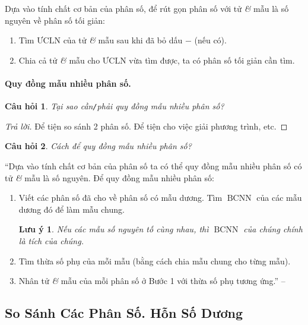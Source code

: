 \documentclass{article}
\numberwithin{equation}{section}
\newtheorem{cauhoi}{Câu hỏi}[section]
\newtheorem{luuy}{Lưu ý}[section]
\begin{document}
Dựa vào tính chất cơ bản của phân số, để rút gọn phân số với tử \textit{\&} mẫu là số nguyên về phân số tối giản:
\begin{enumerate}
	\item Tìm $\mbox{ƯCLN}$ của tử \textit{\&} mẫu sau khi đã bỏ dấu $-$ (nếu có).
	\item Chia cả tử \textit{\&} mẫu cho $\mbox{ƯCLN}$ vừa tìm được, ta có phân số  tối giản cần tìm.
\end{enumerate}

\paragraph{Quy đồng mẫu nhiều phân số.}
\begin{cauhoi}
	Tại sao cần\emph{\texttt{/}}phải quy đồng mẫu nhiều phân số?
\end{cauhoi}

\begin{proof}[Trả lời]
	Để tiện so sánh 2 phân số. Để tiện cho việc giải phương trình, etc.
\end{proof}

\begin{cauhoi}
	Cách để quy đồng mẫu nhiều phân số?
\end{cauhoi}
``Dựa vào tính chất cơ bản của phân số ta có thể quy đồng mẫu nhiều phân số có tử \textit{\&} mẫu là số nguyên. Để quy đồng mẫu nhiều phân số:
\begin{enumerate}
	\item Viết các phân số đã cho về phân số có mẫu dương. Tìm $\operatorname{BCNN}$ của các mẫu dương đó để làm mẫu chung.
	\begin{luuy}
		Nếu các mẫu số nguyên tố cùng nhau, thì $\operatorname{BCNN}$ của chúng chính là tích của chúng.
	\end{luuy}
	\item Tìm thừa số phụ của mỗi mẫu (bằng cách chia mẫu chung cho từng mẫu).
	\item Nhân tử \textit{\&} mẫu của mỗi phân số ở Bước 1 với thừa số phụ tương ứng.'' -- \cite[p. 29]{SGK_Toan_6_Canh_Dieu_tap_2}
\end{enumerate}


\subsection{So Sánh Các Phân Số. Hỗn Số Dương}
\end{document}
